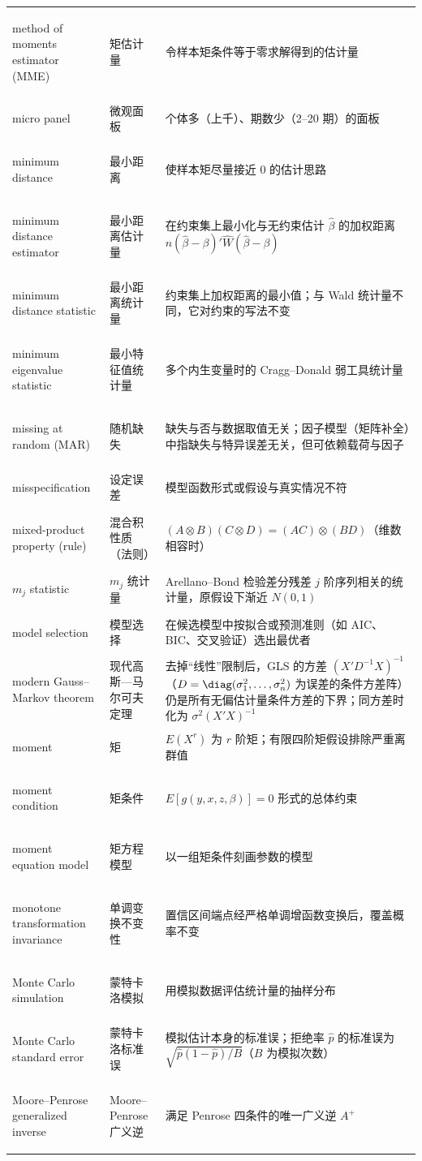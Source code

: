 \begin{longtable}{@{}>{\bfseries\boldmath\raggedright\arraybackslash}p{4.6cm}>{\raggedright\arraybackslash}p{3.2cm}>{\raggedright\arraybackslash}p{\dimexpr\textwidth-7.8cm-4\tabcolsep\relax}@{}}
method of moments estimator (MME) & 矩估计量 & 令样本矩条件等于零求解得到的估计量 \\
micro panel & 微观面板 & 个体多（上千）、期数少（2--20 期）的面板 \\
minimum distance & 最小距离 & 使样本矩尽量接近 0 的估计思路 \\
minimum distance estimator & 最小距离估计量 & 在约束集上最小化与无约束估计 $\hat\beta$ 的加权距离 $n(\hat\beta-\beta)'\hat W(\hat\beta-\beta)$ \\
minimum distance statistic & 最小距离统计量 & 约束集上加权距离的最小值；与 Wald 统计量不同，它对约束的写法不变 \\
minimum eigenvalue statistic & 最小特征值统计量 & 多个内生变量时的 Cragg--Donald 弱工具统计量 \\
missing at random (MAR) & 随机缺失 & 缺失与否与数据取值无关；因子模型（矩阵补全）中指缺失与特异误差无关，但可依赖载荷与因子 \\
misspecification & 设定误差 & 模型函数形式或假设与真实情况不符 \\
mixed-product property (rule) & 混合积性质（法则） & $(A\otimes B)(C\otimes D)=(AC)\otimes(BD)$（维数相容时） \\
$m_j$ statistic & $m_j$ 统计量 & Arellano--Bond 检验差分残差 $j$ 阶序列相关的统计量，原假设下渐近 $N(0,1)$ \\
model selection & 模型选择 & 在候选模型中按拟合或预测准则（如 AIC、BIC、交叉验证）选出最优者 \\
modern Gauss--Markov theorem & 现代高斯—马尔可夫定理 & 去掉“线性”限制后，GLS 的方差 $(X'D^{-1}X)^{-1}$（$D=\diag(\sigma_1^2,\dots,\sigma_n^2)$ 为误差的条件方差阵）仍是所有无偏估计量条件方差的下界；同方差时化为 $\sigma^2(X'X)^{-1}$ \\
moment & 矩 & $E(X^r)$ 为 $r$ 阶矩；有限四阶矩假设排除严重离群值 \\
moment condition & 矩条件 & $E[g(y,x,z,\beta)]=0$ 形式的总体约束 \\
moment equation model & 矩方程模型 & 以一组矩条件刻画参数的模型 \\
monotone transformation invariance & 单调变换不变性 & 置信区间端点经严格单调增函数变换后，覆盖概率不变 \\
Monte Carlo simulation & 蒙特卡洛模拟 & 用模拟数据评估统计量的抽样分布 \\
Monte Carlo standard error & 蒙特卡洛标准误 & 模拟估计本身的标准误；拒绝率 $\hat p$ 的标准误为 $\sqrt{\hat p(1-\hat p)/B}$（$B$ 为模拟次数） \\
Moore--Penrose generalized inverse & Moore--Penrose 广义逆 & 满足 Penrose 四条件的唯一广义逆 $A^{+}$ \\

\end{longtable}
